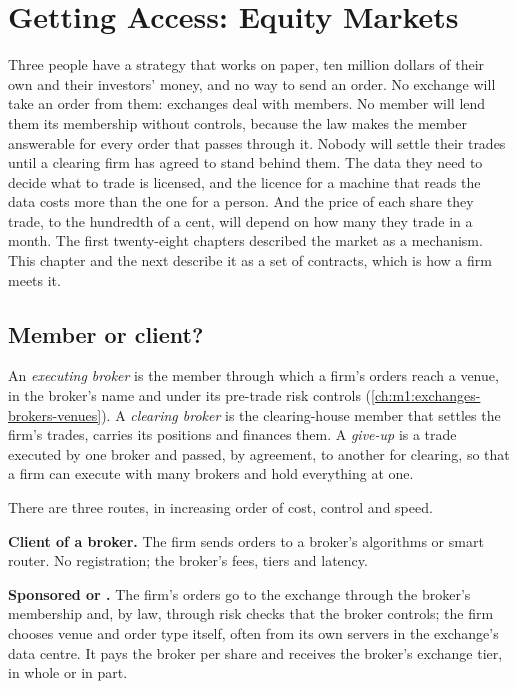 \chapter{Getting Access: Equity Markets}\label{ch:m1:getting-access-equities}

Three people have a strategy that works on paper, ten million dollars of
their own and their investors' money, and no way to send an order. No
exchange will take an order from them: exchanges deal with members. No
member will lend them its membership without controls, because the law makes
the member answerable for every order that passes through it. Nobody will
settle their trades until a clearing firm has agreed to stand behind them.
The data they need to decide what to trade is licensed, and the licence for a
machine that reads the data costs more than the one for a person. And the
price of each share they trade, to the hundredth of a cent, will depend on
how many they trade in a month. The first twenty-eight chapters described the
market as a mechanism. This chapter and the next describe it as a set of
contracts, which is how a firm meets it.

\section{Member or client?}

\begin{definition}\label{def:m1:getting-access-equities:brokers}
An \emph{executing broker} is the member through which
a firm's orders reach a venue, in the broker's name and under its pre-trade
risk controls (\cref{ch:m1:exchanges-brokers-venues}). A \emph{clearing
broker} is the clearing-house member that settles the
firm's trades, carries its positions and finances them. A
\emph{give-up} is a trade executed by one broker
and passed, by agreement, to another for clearing, so that a firm can execute
with many brokers and hold everything at one.
\end{definition}

There are three routes, in increasing order of cost, control and speed.

\textbf{Client of a broker.} The firm sends orders to a broker's algorithms or
smart router. No registration; the broker's fees, tiers and latency.

\textbf{Sponsored or .} The firm's orders go to the
exchange through the broker's membership and, by law, through risk checks
that the broker controls; the firm chooses venue and order type itself, often
from its own servers in the exchange's data centre. It pays the broker per
share and receives the broker's exchange tier, in whole or in part.


